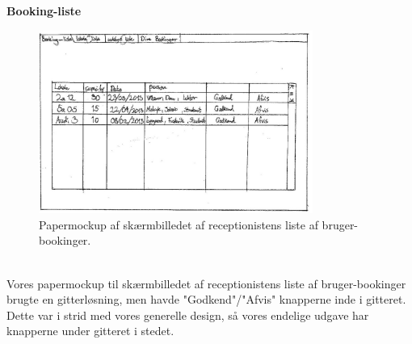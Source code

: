 \clearpage
\textbf{Booking-liste}
\begin{figure}[h!]
  \centering
    \includegraphics[width=0.8\textwidth]{Appendix/GUI-Prototype/PaperMockup/GodkendBookinger_001}
  \caption{Papermockup af skærmbilledet af receptionistens liste af bruger-bookinger.}
\label{Design_G_Development_AendreLokale_Final}
\end{figure} 
\\Vores papermockup til skærmbilledet af receptionistens liste af bruger-bookinger brugte en gitterløsning, men havde "Godkend"/"Afvis" knapperne inde i gitteret. Dette var i strid med vores generelle design, så vores endelige udgave har knapperne under gitteret i stedet.